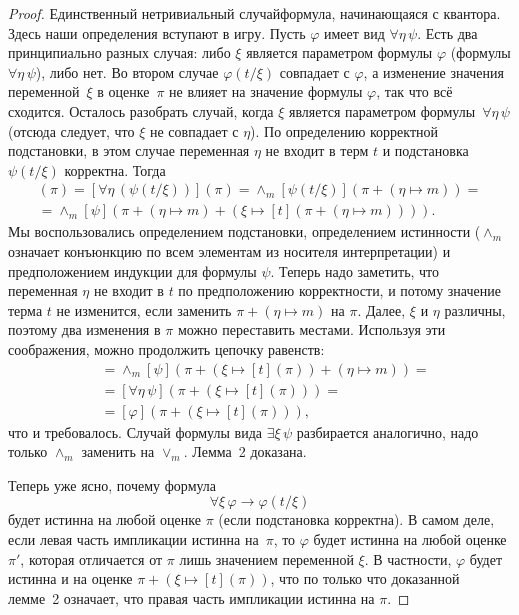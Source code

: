 \begin{proof}
Единственный нетривиальный случай\т формула, начинающаяся с
квантора. Здесь наши определения вступают в игру.
Пусть $\varphi$ имеет вид $\forall \eta\, \psi$. Есть два
принципиально разных случая: либо $\xi$ является параметром
формулы $\varphi$ ( формулы
$\forall \eta\,\psi$), либо нет. Во втором случае
$\varphi(t/\xi)$ совпадает с $\varphi$, а изменение значения
переменной~$\xi$ в оценке~$\pi$ не влияет на значение формулы
$\varphi$, так что всё сходится. Осталось разобрать случай, когда
$\xi$ является параметром формулы~$\forall \eta\,\psi$ (отсюда
следует, что $\xi$ не совпадает с $\eta$). По определению
корректной подстановки, в этом случае переменная $\eta$ не
входит в терм $t$ и подстановка $\psi(t/\xi)$ корректна. Тогда
\begin{multline*}
  [(\forall \eta\, \psi)(t/\xi)](\pi)=
       [\forall \eta\, (\psi(t/\xi))](\pi) =
   \wedge_m [\psi(t/\xi)](\pi+(\eta\mapsto m)) = \\
   =\wedge_m [\psi](\pi+(\eta\mapsto m)+
     (\xi\mapsto[t](\pi+(\eta\mapsto m)))).
\end{multline*}
Мы воспользовались определением подстановки, определением истинности
($\wedge_m$ означает конъюнкцию по всем элементам из носителя
интерпретации) и предположением индукции для формулы $\psi$.
Теперь надо заметить, что переменная $\eta$ не входит в $t$ по
предположению корректности, и потому значение терма $t$ не изменится,
если заменить $\pi+(\eta\mapsto m)$ на $\pi$. Далее, $\xi$ и $\eta$
различны, поэтому два изменения в $\pi$ можно переставить местами.
Используя эти соображения, можно продолжить цепочку равенств:
\begin{align*}
        &=\wedge_m [\psi](\pi+(\xi\mapsto [t](\pi))+(\eta\mapsto m)) = \\
        &=[\forall \eta\,\psi](\pi+(\xi\mapsto [t](\pi))) = \\
        &=[\varphi](\pi+(\xi\mapsto [t](\pi))),
\end{align*}
что и требовалось. Случай формулы вида $\exists\xi\,\psi$
разбирается аналогично, надо только $\wedge_m$ заменить на $\vee_m$.
Лемма~2 доказана.

Теперь уже ясно, почему формула
        $$
\forall \xi \, \varphi \to \varphi(t/\xi)
        $$
будет истинна на любой оценке $\pi$ (если подстановка
корректна). В самом деле, если левая часть импликации истинна
на~$\pi$, то $\varphi$ будет истинна на любой оценке $\pi'$,
которая отличается от $\pi$ лишь значением переменной $\xi$. В
частности, $\varphi$ будет истинна и на оценке $\pi+(\xi\mapsto
[t](\pi))$, что по только что доказанной лемме~2 означает, что
правая часть импликации истинна на $\pi$.


\end{proof}

